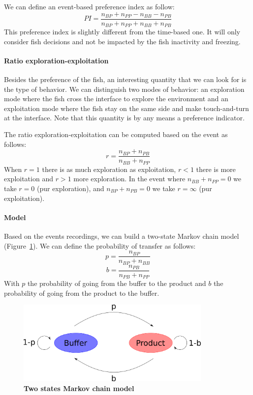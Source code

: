   We can define an event-based preference index as follow:
  $$
  PI = \frac{n_{BP} + n_{PP} - n_{BB} - n_{PB}}{n_{BP} + n_{PP} + n_{BB} + n_{PB}}
  $$
  \noindent This preference index is slightly different from the time-based one. It will only consider fish decisions and not be impacted by the fish inactivity and freezing.

  \paragraph{Ratio exploration-exploitation} Besides the preference of the fish, an interesting quantity that we can look for is the type of behavior. We can distinguish two modes of behavior: an exploration mode where the fish cross the interface to explore the environment and an exploitation mode where the fish stay on the same side and make touch-and-turn at the interface. Note that this quantity is by any means a preference indicator.

  The ratio exploration-exploitation can be computed based on the event as follows:
  $$
  r=\frac{n_{BP} + n_{PB}}{n_{BB} + n_{PP}}
  $$
\noindent When $r=1$ there is as much exploration as exploitation, $r<1$ there is more exploitation and $r>1$ more exploration. In the event where $n_{BB} + n_{PP} = 0$ we take $r=0$ (pur exploration),  and $n_{BP} + n_{PB} = 0$ we take $r=\infty$ (pur exploitation).

  \paragraph{Model} Based on the events recordings, we can build a two-state Markov chain model (Figure~\ref{markov_model}). We can define the probability of transfer as follows:
  $$
  p = \frac{n_{BP}}{n_{BP} + n_{BB}}
  $$
  $$
  b = \frac{n_{PB}}{n_{PB} + n_{PP}}
  $$
  \noindent With $p$ the probability of going from the buffer to the product and $b$ the probability of going from the product to the buffer.

  \begin{figure}[h]
    \centering
    \includegraphics[width=0.85\textwidth]{part_2/assets/model.png}
    \caption{\textbf{Two states Markov chain model}}
    \label{markov_model}
  \end{figure}

